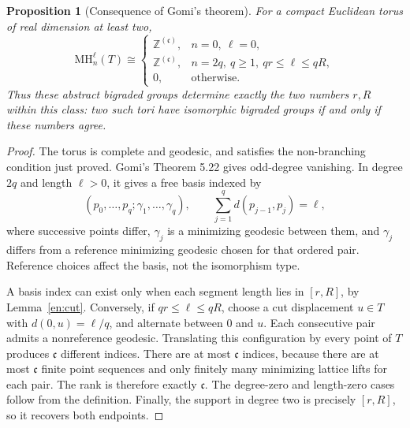 \documentclass[12pt]{amsart}
\newcommand{\PropositionName}{Proposition}
\newtheorem{prop}[thm]{\PropositionName}
\theoremstyle{definition}
\theoremstyle{remark}
\numberwithin{equation}{section}
\newcommand{\Z}{\mathbb{Z}}
\newcommand{\MH}{\mathrm{MH}}
\begin{document}
\begin{prop}[Consequence of Gomi's theorem]\label{en:flat}
For a compact Euclidean torus of real dimension at least two,
\begin{equation}\label{en:flatformula}
\MH_n^\ell(T)\cong
\begin{cases}
\Z^{(\mathfrak c)},&n=0,\ \ell=0,\\
\Z^{(\mathfrak c)},&n=2q,\ q\geq1,\ qr\leq\ell\leq qR,\\
0,&\text{otherwise}.
\end{cases}
\end{equation}
Thus these abstract bigraded groups determine exactly the two numbers $r,R$ within this class: two such tori have isomorphic bigraded groups if and only if these numbers agree.
\end{prop}
\begin{proof}
The torus is complete and geodesic, and satisfies the non-branching condition just proved. Gomi's Theorem 5.22 gives odd-degree vanishing. In degree $2q$ and length $\ell>0$, it gives a free basis indexed by
\begin{equation}\label{en:gomiindex}
(p_0,\ldots,p_q;\gamma_1,\ldots,\gamma_q),\qquad
\sum_{j=1}^q d(p_{j-1},p_j)=\ell,
\end{equation}
where successive points differ, $\gamma_j$ is a minimizing geodesic between them, and $\gamma_j$ differs from a reference minimizing geodesic chosen for that ordered pair. Reference choices affect the basis, not the isomorphism type.

A basis index can exist only when each segment length lies in $[r,R]$, by Lemma~\ref{en:cut}. Conversely, if $qr\leq\ell\leq qR$, choose a cut displacement $u\in T$ with $d(0,u)=\ell/q$, and alternate between $0$ and $u$. Each consecutive pair admits a nonreference geodesic. Translating this configuration by every point of $T$ produces $\mathfrak c$ different indices. There are at most $\mathfrak c$ indices, because there are at most $\mathfrak c$ finite point sequences and only finitely many minimizing lattice lifts for each pair. The rank is therefore exactly $\mathfrak c$. The degree-zero and length-zero cases follow from the definition. Finally, the support in degree two is precisely $[r,R]$, so it recovers both endpoints.
\end{proof}
\end{document}
